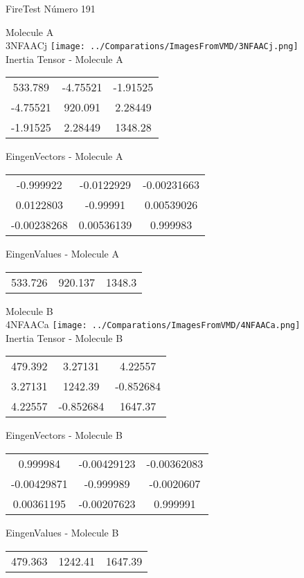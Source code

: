 \vtab[-2cm]
\begin{center}
{\large FireTest \tab Número 191}
\end{center}
\begin{multicols}{2}
\begin{center}

Molecule A \\ 
3NFAACj
\texttt{[image: ../Comparations/ImagesFromVMD/3NFAACj.png]}
\\
Inertia Tensor - Molecule A \\
\vtab

\begin{tabular}{|c c c|}
533.789	 & 	-4.75521	 & 	-1.91525	 \\
-4.75521	 & 	920.091	 & 	2.28449	 \\
-1.91525	 & 	2.28449	 & 	1348.28
\end{tabular}

\vtab
 EingenVectors - Molecule A     \\
\vtab
\begin{tabular}{|c c c|}
-0.999922	 & 	-0.0122929	 & 	-0.00231663	 \\
0.0122803	 & 	-0.99991	 & 	0.00539026	 \\
-0.00238268	 & 	0.00536139	 & 	0.999983
\end{tabular}

\vtab
 EingenValues - Molecule A     \\
\vtab
\begin{tabular}{|c c c|}
533.726	 & 	920.137	 & 	1348.3	 \\
\end{tabular}
\columnbreak

Molecule B \\ 
4NFAACa
\texttt{[image: ../Comparations/ImagesFromVMD/4NFAACa.png]}
\\
Inertia Tensor - Molecule B \\
\vtab

\begin{tabular}{|c c c|}
479.392	 & 	3.27131	 & 	4.22557	 \\
3.27131	 & 	1242.39	 & 	-0.852684	 \\
4.22557	 & 	-0.852684	 & 	1647.37
\end{tabular}

\vtab
 EingenVectors - Molecule B     \\
\vtab
\begin{tabular}{|c c c|}
0.999984	 & 	-0.00429123	 & 	-0.00362083	 \\
-0.00429871	 & 	-0.999989	 & 	-0.0020607	 \\
0.00361195	 & 	-0.00207623	 & 	0.999991
\end{tabular}

\vtab
 EingenValues - Molecule B     \\
\vtab
\begin{tabular}{|c c c|}
479.363	 & 	1242.41	 & 	1647.39	 \\
\end{tabular}

\end{center}
\end{multicols}
